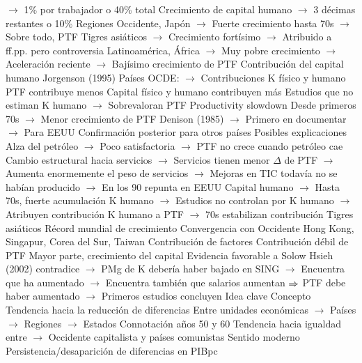 \documentclass{nuevotema}
\begin{document}
\begin{esquemal}
				\4[] $\to$ 1\% por trabajador o 40\% total
				\4 Crecimiento de capital humano
				\4[] $\to$ 3 décimas restantes o 10\%
				\4 Regiones
				\4[] Occidente, Japón
				\4[] $\to$ Fuerte crecimiento hasta 70s
				\4[] $\to$ Sobre todo, PTF
				\4[] Tigres asiáticos
				\4[] $\to$ Crecimiento fortísimo
				\4[] $\to$ Atribuido a ff.pp. pero controversia
				\4[] Latinoamérica, África
				\4[] $\to$ Muy pobre crecimiento
				\4[] $\to$ Aceleración reciente
				\4[] $\to$ Bajísimo crecimiento de PTF
			\3 Contribución del capital humano
				\4 Jorgenson (1995)
				\4[] Países OCDE:
				\4[] $\to$ Contribuciones K físico y humano
				\4[] PTF contribuye menos
				\4[] Capital físico y humano contribuyen más
				\4[] Estudios que no estiman K humano
				\4[] $\to$ Sobrevaloran PTF
			\3 Productivity slowdown
				\4 Desde primeros 70s
				\4[] $\to$ Menor crecimiento de PTF
				\4[] Denison (1985)
				\4[] $\to$ Primero en documentar
				\4[] $\to$ Para EEUU
				\4[] Confirmación posterior para otros países
				\4 Posibles explicaciones
				\4[] Alza del petróleo
				\4[] $\to$ Poco satisfactoria
				\4[] $\to$ PTF no crece cuando petróleo cae
				\4[] Cambio estructural hacia servicios
				\4[] $\to$ Servicios tienen menor $\Delta$ de PTF
				\4[] $\to$ Aumenta enormemente el peso de servicios
				\4[] $\to$ Mejoras en TIC todavía no se habían producido
				\4[] $\to$ En los 90 repunta en EEUU
				\4[] Capital humano
				\4[] $\to$ Hasta 70s, fuerte acumulación K humano
				\4[] $\to$ Estudios no controlan por K humano
				\4[] $\to$ Atribuyen contribución K humano a PTF
				\4[] $\to$ 70s estabilizan contribución
			\3 Tigres asiáticos
				\4 Récord mundial de crecimiento
				\4 Convergencia con Occidente
				\4[] Hong Kong, Singapur, Corea del Sur, Taiwan
				\4 Contribución de factores
				\4[] Contribución débil de PTF
				\4[] Mayor parte, crecimiento del capital
				\4[] Evidencia favorable a Solow
				\4[] Hsieh (2002) contradice
				\4[] $\to$ PMg de K debería haber bajado en SING
				\4[] $\to$ Encuentra que ha aumentado
				\4[] $\to$ Encuentra también que salarios aumentan
				\4[] $\Rightarrow$ PTF debe haber aumentado
				\4[] $\to$ Primeros estudios concluyen
	\1 
		\2 Idea clave
			\3 Concepto
				\4 Tendencia hacia la reducción de diferencias
				\4[] Entre unidades económicas
				\4[] $\to$ Países
				\4[] $\to$ Regiones
				\4[] $\to$ Estados
				\4 Connotación años 50 y 60
				\4[] Tendencia hacia igualdad entre
				\4[] $\to$ Occidente capitalista y países comunistas
				\4 Sentido moderno
				\4[] Persistencia/desaparición de diferencias en PIBpc

\end{esquemal}
\end{document}

